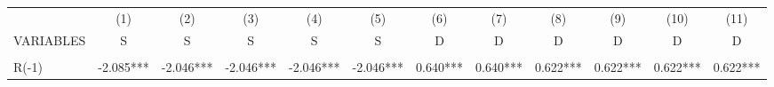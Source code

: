 \documentclass[]{article}
\begin{document}
\begin{center}
\begin{tabular}{lccccccccccc} \hline
 & (1) & (2) & (3) & (4) & (5) & (6) & (7) & (8) & (9) & (10) & (11) \\
VARIABLES & S & S & S & S & S & D & D & D & D & D & D \\ \hline
\vspace{4pt} & \begin{footnotesize}\end{footnotesize} & \begin{footnotesize}\end{footnotesize} & \begin{footnotesize}\end{footnotesize} & \begin{footnotesize}\end{footnotesize} & \begin{footnotesize}\end{footnotesize} & \begin{footnotesize}\end{footnotesize} & \begin{footnotesize}\end{footnotesize} & \begin{footnotesize}\end{footnotesize} & \begin{footnotesize}\end{footnotesize} & \begin{footnotesize}\end{footnotesize} & \begin{footnotesize}\end{footnotesize} \\
R(-1) & -2.085*** & -2.046*** & -2.046*** & -2.046*** & -2.046*** & 0.640*** & 0.640*** & 0.622*** & 0.622*** & 0.622*** & 0.622*** \\

\end{tabular}
\end{center}
\end{document}
